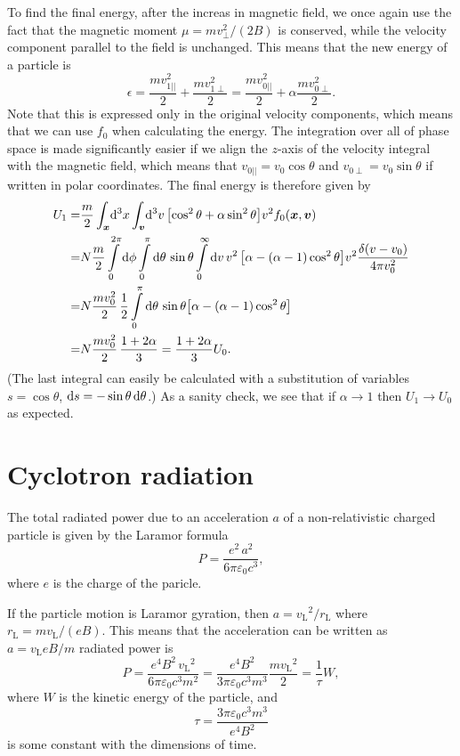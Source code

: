 \documentclass[11pt,a4paper, 
swedish, english %
]{article}
\newcommand{\rL}{\ensuremath{r_{\text{L}}}}
\newcommand{\vL}{\ensuremath{v_{\text{L}}}}
\begin{document}
To find the final energy, after the increas in magnetic field, we once
again use the fact that the magnetic moment  $\mu=mv_\perp^2/(2B)$ is
conserved, while the velocity component parallel to the field is
unchanged. This means that the new energy of a particle is 
\begin{equation}
\epsilon = \frac{mv_{1||}^2}{2}+\frac{mv_{1\perp}^2}{2}
=\frac{mv_{0||}^2}{2}+\alpha\frac{mv_{0\perp}^2}{2}.
\end{equation}
Note that this is expressed only in the original velocity components,
which means that we can use $f_0$ when calculating the energy. 
The integration over all of phase space is made significantly easier
if we align the $z$-axis of the velocity integral with the magnetic
field, which means that $v_{0||}=v_0\cos\theta$ and
$v_{0\perp}=v_0\sin\theta$ if written in polar coordinates. 
The final energy is therefore given by
\begin{equation}
\begin{aligned}
U_1 =& \frac{m}{2}\oldint_{\vb*x}\!\rd^3x \oldint_{\vb*v}\!\rd^3v \,
\qty[\cos^2\theta + \alpha\sin^2\theta] v^2 f_0(\vb*x, \vb*v)\\
=&N\frac{m}{2}
\int_0^{2\pi}\rd\phi\int_0^\pi\rd\theta\,\sin\theta
\int_0^\infty \rd{v}\, v^2\,
\qty[\alpha - (\alpha-1)\cos^2\theta] v^2\frac{\delta(v-v_0)}{4\pi v_0^2}\\
=&N\frac{mv_0^2}{2}\,\frac{1}{2}
\int_0^\pi\rd\theta\,\sin\theta
\qty[\alpha - (\alpha-1)\cos^2\theta]\\
=&N\frac{mv_0^2}{2}\,\frac{1+2\alpha}{3}
=\frac{1+2\alpha}{3}U_0.
\end{aligned}
\end{equation}
(The last integral can easily be calculated with a substitution of
variables $s=\cos\theta$, $\mathrm{d}{s}=-\sin\theta\,\mathrm{d}\theta$.) As a
sanity check, we see that if $\alpha\to1$ then $U_1\to U_0$ as
expected. 



\section{Cyclotron radiation}
The total radiated power due to an acceleration $a$ of a
non-relativistic charged particle is given by the Laramor formula 
\begin{equation}
P = \frac{e^2\, a^2}{6\pi \varepsilon_0 c^3},
\end{equation}
where $e$ is the charge of the paricle.

If the particle motion is Laramor gyration, then $a=\vL^2/\rL$ where
$\rL=m\vL/(eB)$. This means that the acceleration can be written as
$a=\vL eB/m$
radiated power is
\begin{equation}\label{eq5:PL}
P=\frac{e^4B^2\, \vL^2}{6\pi \varepsilon_0 c^3m^2}
=\frac{e^4B^2}{3\pi \varepsilon_0 c^3m^3}
\frac{m\vL^2}{2}
=\frac{1}{\tau}W,
\end{equation}
where $W$ is the kinetic energy of the particle, and
\begin{equation}\label{eq5:decay-time}
\tau = \frac{3\pi \varepsilon_0 c^3m^3}{e^4B^2}
\end{equation}
is some constant with the dimensions of time.
\end{document}
